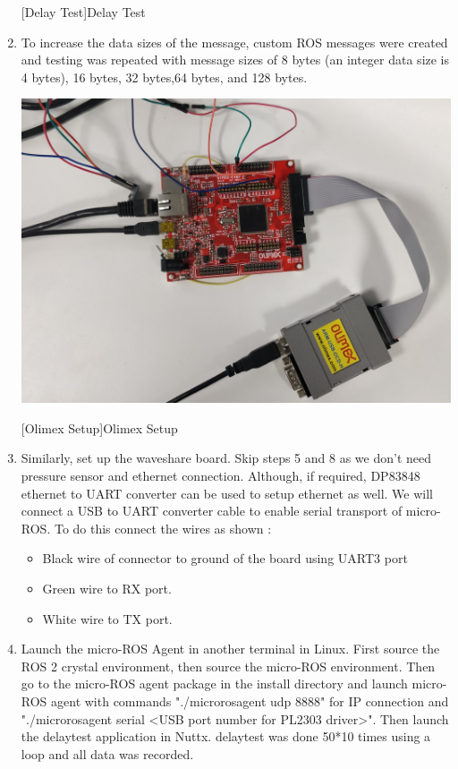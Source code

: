 \documentclass[%
xelatex,
	oneside,		%
	12pt,			%
	parskip=half,	%
	abstracton,
	chapterprefix=true%
    appendixprefix=true]
{scrbook}
\begin{document}
\begin{enumerate}
\begin{center}
[Delay Test]{Delay Test}
\label{fig:delay}
\end{center}
\item To increase the data sizes of the message, custom ROS messages were created and testing was repeated with message sizes of 8 bytes (an integer data size is 4 bytes), 16 bytes, 32 bytes,64 bytes, and 128 bytes.
\begin{center}
\includegraphics[scale=0.1]{fig/olimex.jpg}

[Olimex Setup]{Olimex Setup}
\label{fig:olimexsetup}
\end{center}
\item Similarly, set up the waveshare board. Skip steps 5 and 8 as we don't need pressure sensor and ethernet connection. Although, if required, DP83848 ethernet to UART converter can be used to setup ethernet as well. We will connect a USB to UART converter cable to enable serial transport of micro-ROS. To do this connect the wires as shown : 
\begin{itemize}
\item Black wire of connector to ground of the board using UART3 port
\item Green wire to RX port.
\item White wire to TX port.
\end{itemize}
\item Launch the micro-ROS Agent in another terminal in Linux. First source the ROS 2 crystal environment, then source the micro-ROS environment. Then go to the micro-ROS agent package in the install directory and launch micro-ROS agent with commands "./micro\textunderscore ros\textunderscore agent udp 8888" for IP connection and "./micro\textunderscore ros\textunderscore agent serial <USB port number for PL2303 driver>". Then launch the delay\textunderscore test application in Nuttx. delay\textunderscore test was done 50*10 times using a loop and all data was recorded.
\end{enumerate}
\end{document}

